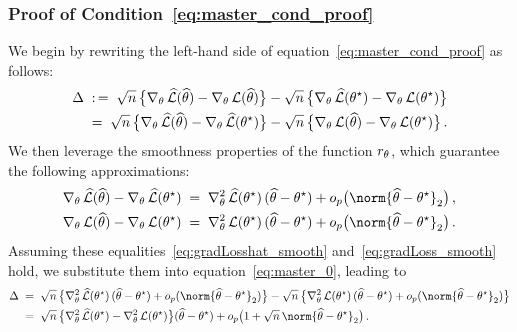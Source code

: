 	\subsubsection{Proof of Condition~\eqref{eq:master_cond_proof}}
	\label{sec:proof:eq:master_cond_proof}
	We begin by rewriting the left-hand side of equation~\eqref{eq:master_cond_proof} as follows:
	\begin{align}
		\Delta
		& \; :\,= \; \sqrt{n} \, \big\{ \nabla_{\theta} \,  \widehat{\mathcal{L}} (\widehat{\theta}) - \nabla_{\theta} \,  \mathcal{L}(\widehat{\theta}) \big\} - \sqrt{n} \, \big\{ \nabla_{\theta} \,  \widehat{\mathcal{L}} (\theta^{\star}) - \nabla_{\theta} \,  \mathcal{L} (\theta^{\star}) \big\}   \notag  \\
		& \; = \; \sqrt{n} \, \big\{ \nabla_{\theta} \,  \widehat{\mathcal{L}} (\widehat{\theta}) - \nabla_{\theta} \,  \widehat{\mathcal{L}}(\theta^{\star}) \big\} - \sqrt{n} \, \big\{ \nabla_{\theta} \,  \mathcal{L} (\widehat{\theta}) - \nabla_{\theta} \,  \mathcal{L} (\theta^{\star}) \big\} \, .
		\label{eq:master_0}
	\end{align}
	We then leverage the smoothness properties of the function $r_{\theta}$, which guarantee the following approximations:
	\begin{subequations}
		\begin{align}
			\label{eq:gradLosshat_smooth}
			\gradtheta \Losshat(\parathetahat) - \gradtheta \Losshat(\parathetastar) & \; = \; \hesstheta \Losshat(\parathetastar) \, (\parathetahat - \parathetastar) + \smallop \big( \norm{\parathetahat - \parathetastar}_2 \big) \, ,  \\
			\label{eq:gradLoss_smooth}
			\gradtheta \Loss(\parathetahat) - \gradtheta \Loss(\parathetastar) & \; = \; \hesstheta \Loss(\parathetastar) \, (\parathetahat - \parathetastar) + \smallop \big( \norm{\parathetahat - \parathetastar}_2 \big) \, .
		\end{align}
	\end{subequations}
	Assuming these equalities~\eqref{eq:gradLosshat_smooth} and~\eqref{eq:gradLoss_smooth} hold, we substitute them into equation~\eqref{eq:master_0}, leading to
	\begin{align}
		\Delta
		& \; = \; \sqrt{n} \, \big\{ \hesstheta \Losshat (\parathetastar) \, (\parathetahat - \parathetastar) + \smallop( \norm{\parathetahat - \parathetastar}_2 ) \big\} - \sqrt{n} \, \big\{ \hesstheta \Loss (\parathetastar) \, (\parathetahat - \parathetastar) + \smallop( \norm{\parathetahat - \parathetastar}_2 ) \big\}  \notag \\
		& \; = \; \sqrt{n} \, \big\{ \hesstheta \Losshat (\parathetastar) - \hesstheta \Loss (\parathetastar) \big\} (\parathetahat - \parathetastar) + \smallop \big( 1 + \sqrt{n} \, \norm{ \parathetahat - \parathetastar }_2 \big) \, .
		\label{eq:master_1}
	\end{align}
